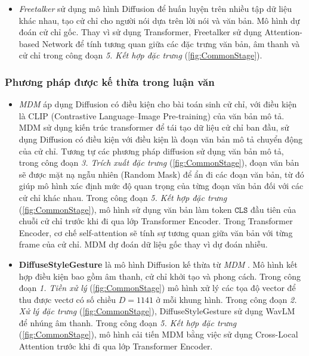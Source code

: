 \begin{itemize}
	\item \textit{Freetalker} \cite{yang2024freetalker} sử dụng mô hình Diffusion để huấn luyện trên nhiều tập dữ liệu khác nhau, tạo cử chỉ cho người nói dựa trên lời nói và văn bản. Mô hình dự đoán cử chỉ gốc. Thay vì sử dụng Transformer, Freetalker sử dụng Attention-based Network để tính tương quan giữa các đặc trưng văn bản, âm thanh và cử chỉ trong công đoạn \textit{5. Kết hợp đặc trưng} (\autoref{fig:CommonStage}).
\end{itemize}


\subsubsection{Phương pháp được kế thừa trong luận văn}

\begin{itemize}
	\item \textit{MDM} \cite{tevet2022human}  áp dụng Diffusion có điều kiện cho bài toán sinh cử chỉ, với điều kiện là CLIP (Contrastive Language–Image Pre-training) của văn bản mô tả. MDM sử dụng kiến trúc transformer để tái tạo dữ liệu cử chỉ ban đầu, sử dụng Diffusion có điều kiện với điều kiện là đoạn văn bản mô tả chuyển động của cử chỉ. Tương tự các phương pháp diffusion sử dụng văn bản mô tả, trong công đoạn \textit{3. Trích xuất đặc trưng} (\autoref{fig:CommonStage}), đoạn văn bản sẽ được mặt nạ ngẫu nhiên (Random Mask) để ẩn đi các đoạn văn bản, từ đó giúp mô hình xác định mức độ quan trọng của từng đoạn văn bản đối với các cử chỉ khác nhau.
	Trong công đoạn \textit{5. Kết hợp đặc trưng} (\autoref{fig:CommonStage}), mô hình sử dụng văn bản làm token $\texttt{CLS}$ đầu tiên của chuỗi cử chỉ trước khi đi qua lớp Transformer Encoder. Trong Transformer Encoder, cơ chế self-attention sẽ tính sự tương quan giữa văn bản với từng frame của cử chỉ. MDM dự đoán dữ liệu gốc thay vì dự đoán nhiễu.
	
	\item \textbf{DiffuseStyleGesture} \cite{yang2023diffusestylegesture} là mô hình Diffusion kế thừa từ \textit{MDM} \cite{tevet2022human}. Mô hình kết hợp điều kiện bao gồm âm thanh, cử chỉ khởi tạo và phong cách. Trong công đoạn \textit{1. Tiền xử lý} (\autoref{fig:CommonStage}) mô hình xử lý các tọa độ vector để thu được vectơ có số chiều $D=1141$ ở mỗi khung hình. Trong công đoạn \textit{2. Xử lý đặc trưng} (\autoref{fig:CommonStage}), DiffuseStyleGesture sử dụng WavLM để nhúng âm thanh. Trong công đoạn \textit{5. Kết hợp đặc trưng} (\autoref{fig:CommonStage}), mô hình cải tiến MDM bằng việc sử dụng Cross-Local Attention trước khi đi qua lớp Transformer Encoder.
\end{itemize}

